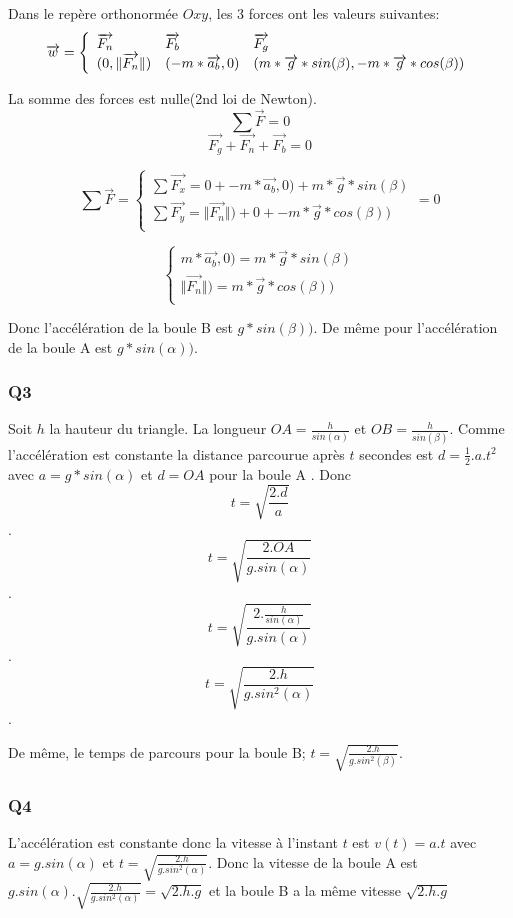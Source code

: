 \documentclass[]{book}
\theoremstyle{definition}
\begin{document}
Dans le rep\`ere orthonorm\'ee $Oxy$, les 3 forces ont les valeurs suivantes:
$$\overrightarrow{w} = 
\left\{ 
\begin{array}{l l l }
\overrightarrow{F_n} & \overrightarrow{F_b} & \overrightarrow{F_g} \\ 
 (0, \Vert \overrightarrow{F_n} \Vert) & (-m * \overrightarrow{a_b},0) & (m*\overrightarrow{g}*sin(\beta), -m*\overrightarrow{g}*cos(\beta)) \\
\end{array}
\right. 
$$

La somme des forces est nulle(2nd loi de Newton).
$$ \sum{\overrightarrow{F}} = 0$$
$$ \overrightarrow{F_g} + \overrightarrow{F_n} + \overrightarrow{F_b} = 0$$

$$\sum{\overrightarrow{F}} = 
\left\{ 
\begin{array}{l}
\sum{\overrightarrow{F_x}} =  0 +  -m * \overrightarrow{a_b},0) + m*\overrightarrow{g}*sin(\beta) \\
\sum{\overrightarrow{F_y}} = \Vert \overrightarrow{F_n} \Vert) + 0 + -m*\overrightarrow{g}*cos(\beta)) \\
\end{array}
\right. 
= 0
$$

$$
\left\{ 
\begin{array}{l}
m * \overrightarrow{a_b},0) = m*\overrightarrow{g}*sin(\beta) \\
\Vert \overrightarrow{F_n} \Vert) = m*\overrightarrow{g}*cos(\beta)) \\
\end{array}
\right. 
$$

Donc l'acc\'el\'eration de la boule B est $g*sin(\beta))$.
De m\^eme pour l'acc\'el\'eration de la boule A est $g*sin(\alpha))$.

\subsubsection*{Q3}
Soit $h$ la hauteur du triangle. La longueur $OA = \frac{h}{sin(\alpha)}$ et $OB = \frac{h}{sin(\beta)}$. Comme l'acc\'el\'eration est constante 
la distance parcourue apr\`es $t$ secondes est $d = \frac{1}{2}.a.t^2$ avec $a = g*sin(\alpha)$ et $d = OA$ pour la boule A . Donc
$$ t = \sqrt{\frac{2.d}{a}}$$.
$$ t = \sqrt{\frac{2.OA}{g.sin(\alpha)}}$$.
$$ t = \sqrt{\frac{2.\frac{h}{sin(\alpha)}}{g.sin(\alpha)}}$$.
$$ t = \sqrt{\frac{2.h}{g.sin^2(\alpha)}}$$.

De m\^eme, le temps de parcours pour la boule B; $ t = \sqrt{\frac{2.h}{g.sin^2(\beta)}}$.
  

\subsubsection*{Q4}
L'acc\'el\'eration est constante donc la vitesse \`a l'instant $t$ est $v(t) = a.t$ avec $a = g.sin(\alpha)$ et $ t = \sqrt{\frac{2.h}{g.sin^2(\alpha)}}$.
Donc la vitesse de la boule A est $g.sin(\alpha) . \sqrt{\frac{2.h}{g.sin^2(\alpha)}} = \sqrt{2.h.g}$ et la boule B a la m\^eme vitesse $\sqrt{2.h.g}$
\end{document}
